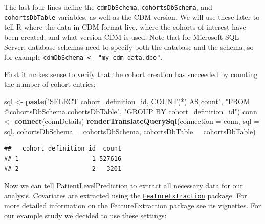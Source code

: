 \documentclass[11pt]{book}
\newenvironment{Shaded}{\begin{snugshade}}{\end{snugshade}}
\newcommand{\DataTypeTok}[1]{\textcolor[rgb]{0.13,0.29,0.53}{#1}}
\newcommand{\KeywordTok}[1]{\textcolor[rgb]{0.13,0.29,0.53}{\textbf{#1}}}
\newcommand{\NormalTok}[1]{#1}
\newcommand{\StringTok}[1]{\textcolor[rgb]{0.31,0.60,0.02}{#1}}
\theoremstyle{definition}
\theoremstyle{definition}
\theoremstyle{definition}
\theoremstyle{remark}
\begin{document}
The last four lines define the \texttt{cdmDbSchema}, \texttt{cohortsDbSchema}, and \texttt{cohortsDbTable} variables, as well as the CDM version. We will use these later to tell R where the data in CDM format live, where the cohorts of interest have been created, and what version CDM is used. Note that for Microsoft SQL Server, database schemas need to specify both the database and the schema, so for example \texttt{cdmDbSchema\ \textless{}-\ "my\_cdm\_data.dbo"}.

First it makes sense to verify that the cohort creation has succeeded by counting the number of cohort entries:

\begin{Shaded}
\begin{Highlighting}[]
\NormalTok{sql <-}\StringTok{ }\KeywordTok{paste}\NormalTok{(}\StringTok{"SELECT cohort_definition_id, COUNT(*) AS count"}\NormalTok{,}
\StringTok{"FROM @cohortsDbSchema.cohortsDbTable"}\NormalTok{,}
\StringTok{"GROUP BY cohort_definition_id"}\NormalTok{)}
\NormalTok{conn <-}\StringTok{ }\KeywordTok{connect}\NormalTok{(connDetails)}
\KeywordTok{renderTranslateQuerySql}\NormalTok{(}\DataTypeTok{connection =}\NormalTok{ conn, }
                        \DataTypeTok{sql =}\NormalTok{ sql,}
                        \DataTypeTok{cohortsDbSchema =}\NormalTok{ cohortsDbSchema,}
                        \DataTypeTok{cohortsDbTable =}\NormalTok{ cohortsDbTable)}
\end{Highlighting}
\end{Shaded}

\begin{verbatim}
##   cohort_definition_id  count
## 1                    1 527616
## 2                    2   3201
\end{verbatim}

Now we can tell \href{https://ohdsi.github.io/PatientLevelPrediction/}{PatientLevelPrediction} to extract all necessary data for our analysis. Covariates are extracted using the \href{https://ohdsi.github.io/FeatureExtraction/}{\texttt{FeatureExtraction}} package. For more detailed information on the FeatureExtraction package see its vignettes. For our example study we decided to use these settings:
\end{document}
